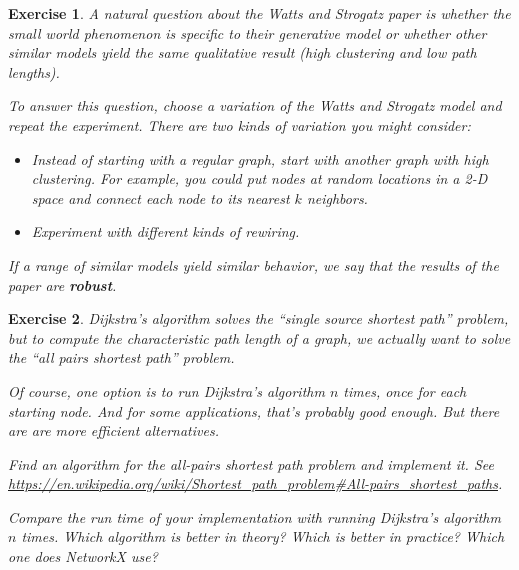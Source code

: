 \documentclass[12pt]{book}
\theoremstyle{exercise}
\newtheorem{exercise}{Exercise}[chapter]
\begin{document}
\begin{exercise}

A natural question about the Watts and Strogatz paper is
whether the small world phenomenon is specific to their
generative model or whether other similar models yield
the same qualitative result (high clustering and low path lengths).

To answer this question, choose a variation of the
Watts and Strogatz model and repeat the experiment.
There are two kinds of variation you might consider:

\begin{itemize}

\item Instead of starting with a regular graph, start with
another graph with high clustering.  For example, you could
put nodes at random locations in a 2-D space
and connect each node to its nearest $k$ neighbors.

\item Experiment with different kinds of rewiring.

\end{itemize}

If a range of similar models yield similar behavior, we
say that the results of the paper are {\bf robust}.

\end{exercise}


\begin{exercise}

Dijkstra's algorithm solves the ``single source shortest path''
problem, but to compute the characteristic path length of a graph,
we actually want to solve the ``all pairs shortest path'' problem.

Of course, one option is to run Dijkstra's algorithm $n$ times,
once for each starting node.  And for some applications, that's
probably good enough.  But there are are more efficient alternatives.

Find an algorithm for the all-pairs shortest path problem and
implement it.  See
\url{https://en.wikipedia.org/wiki/Shortest_path_problem#All-pairs_shortest_paths}.

Compare the run time of your implementation with running
Dijkstra's algorithm $n$ times.  Which algorithm is better in
theory?  Which is better in practice?  Which one does NetworkX
use?


\end{exercise}
\end{document}
